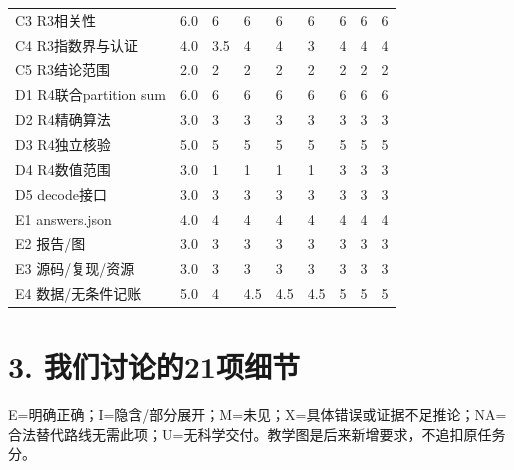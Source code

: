 \documentclass[11pt,a4paper]{article}
\begin{document}
{\begin{longtable}
{}C3 R3相关性 & 6.0 & 6 & 6 & 6 & 6 & 6 & 6 & 6\tabularnewline
{}C4 R3指数界与认证 & 4.0 & 3.5 & 4 & 4 & 3 & 4 & 4 & 4\tabularnewline
{}C5 R3结论范围 & 2.0 & 2 & 2 & 2 & 2 & 2 & 2 & 2\tabularnewline
{}D1 R4联合partition sum & 6.0 & 6 & 6 & 6 & 6 & 6 & 6 & 6\tabularnewline
{}D2 R4精确算法 & 3.0 & 3 & 3 & 3 & 3 & 3 & 3 & 3\tabularnewline
{}D3 R4独立核验 & 5.0 & 5 & 5 & 5 & 5 & 5 & 5 & 5\tabularnewline
{}D4 R4数值范围 & 3.0 & 1 & 1 & 1 & 1 & 3 & 3 & 3\tabularnewline
{}D5 decode接口 & 3.0 & 3 & 3 & 3 & 3 & 3 & 3 & 3\tabularnewline
{}E1 answers.json & 4.0 & 4 & 4 & 4 & 4 & 4 & 4 & 4\tabularnewline
{}E2 报告/图 & 3.0 & 3 & 3 & 3 & 3 & 3 & 3 & 3\tabularnewline
{}E3 源码/复现/资源 & 3.0 & 3 & 3 & 3 & 3 & 3 & 3 & 3\tabularnewline
{}E4 数据/无条件记账 & 5.0 & 4 & 4.5 & 4.5 & 4.5 & 5 & 5 & 5\tabularnewline
\bottomrule
\end{longtable}
}

\section*{3. 我们讨论的21项细节}

E=明确正确；I=隐含/部分展开；M=未见；X=具体错误或证据不足推论；NA=合法替代路线无需此项；U=无科学交付。教学图是后来新增要求，不追扣原任务分。
\end{document}

